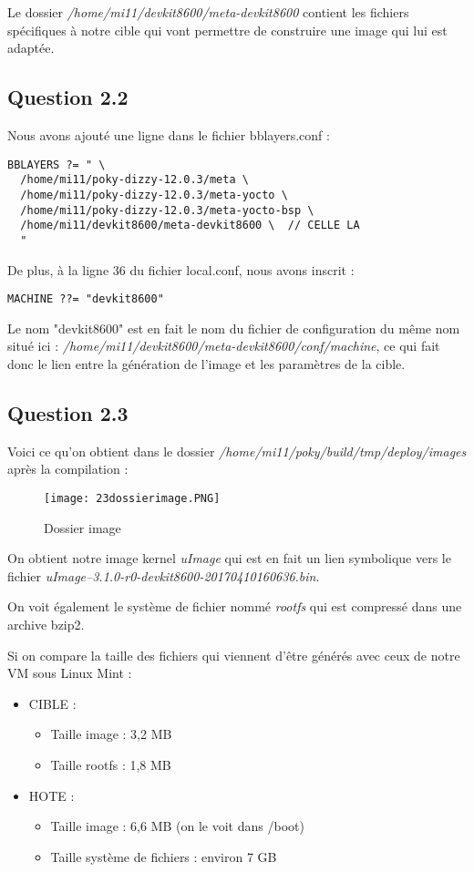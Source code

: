 \documentclass[a4paper,12pt]{report}
\begin{document}
Le dossier \textit{/home/mi11/devkit8600/meta-devkit8600} contient les fichiers spécifiques à notre cible qui vont permettre de construire une image qui lui est adaptée.

\subsection{Question 2.2}
Nous avons ajouté une ligne dans le fichier bblayers.conf :

\begin{lstlisting}
BBLAYERS ?= " \
  /home/mi11/poky-dizzy-12.0.3/meta \
  /home/mi11/poky-dizzy-12.0.3/meta-yocto \
  /home/mi11/poky-dizzy-12.0.3/meta-yocto-bsp \
  /home/mi11/devkit8600/meta-devkit8600 \  // CELLE LA
  "
\end{lstlisting}

De plus, à la ligne 36 du fichier local.conf, nous avons inscrit :

\begin{lstlisting}
MACHINE ??= "devkit8600"
\end{lstlisting}

Le nom "devkit8600" est en fait le nom du fichier de configuration du même nom situé ici : 
\textit{/home/mi11/devkit8600/meta-devkit8600/conf/machine}, ce qui fait donc le lien entre la génération de l'image et les paramètres de la cible.

\subsection{Question 2.3}
Voici ce qu'on obtient dans le dossier \textit{/home/mi11/poky/build/tmp/deploy/images} après la compilation : \smallbreak

\begin{figure}
\texttt{[image: 23dossierimage.PNG]}
\caption{Dossier image} \bigbreak
\end{figure}


On obtient notre image kernel \textit{uImage} qui est en fait un lien symbolique vers le fichier \textit{uImage--3.1.0-r0-devkit8600-20170410160636.bin}.

On voit également le système de fichier nommé \textit{rootfs} qui est compressé dans une archive bzip2.

Si on compare la taille des fichiers qui viennent d'être générés avec ceux de notre VM sous Linux Mint :

\begin{itemize}
\item CIBLE :
\begin{itemize}
\item Taille image : 3,2 MB
\item Taille rootfs : 1,8 MB
\end{itemize}
\item HOTE :
\begin{itemize}
\item Taille image : 6,6 MB (on le voit dans /boot)
\item Taille système de fichiers : environ 7 GB
\end{itemize}
\end{itemize}
\end{document}
